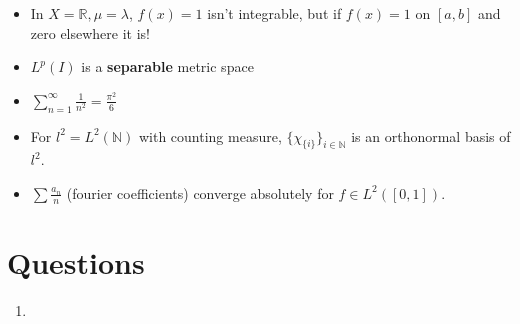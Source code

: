 \documentclass[a4paper, 12pt]{article}
\def\R{\ensuremath{\mathbb{R}}} %
\def\N{\ensuremath{\mathbb{N}}}
\newcommand{\bt}[1]{\textbf{#1}} %
\newcommand{\gray}[1]{{\leavevmode\color[gray]{0.5}{#1}}} %
\begin{document}
\begin{multicols}{2}
\begin{itemize}
    \item In $X = \R, \mu= \lambda$, $f(x) = 1$ isn't integrable, but 
    if $f(x) = 1$ on $[a, b]$ and zero elsewhere it is! 
    \item $L^p(I)$ is a \bt{separable} metric space
    \item $\sum_{n=1}^\infty \frac{1}{n^2} = \frac{\pi^2}{6}$ \\
    \gray{why? compute fourier for $f(x) = x$ on $[-\pi, \pi]$}
    \item For $l^2 = L^2(\N)$ with counting measure, 
    $\{\chi_{\{i\}}\}_{i \in \N}$ is an orthonormal basis of $l^2$.
    \item $\sum \frac{a_n}{n}$ (fourier coefficients) converge absolutely 
    for $f \in L^2([0, 1])$.
\end{itemize}
\section{Questions}
\begin{enumerate}
    \item
\end{enumerate}



\end{multicols}
\end{document}
